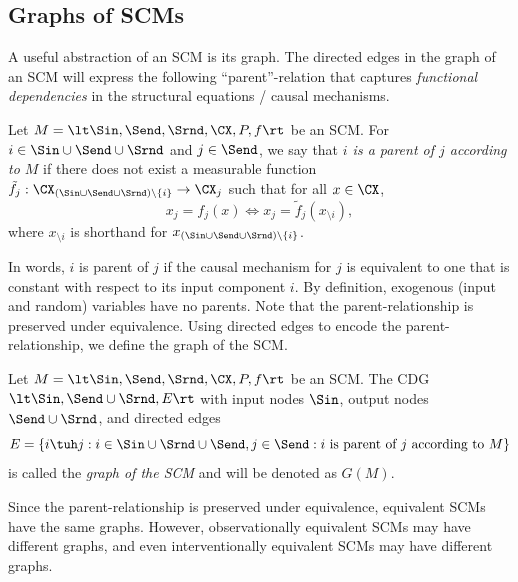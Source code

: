 \subsection{Graphs of SCMs}

A useful abstraction of an SCM is its graph. 
The directed edges in the graph of an SCM will express the following ``parent''-relation that captures \emph{functional dependencies} in the structural equations / causal mechanisms.
\begin{Def}\label{def:scm_parent}
  Let $M = \lt \Sin, \Send, \Srnd, \CX, P, f \rt$ be an SCM.
  For $i \in \Sin \cup \Send \cup \Srnd$ and $j \in \Send$, we say that
  \emph{$i$ is a parent of $j$ according to $M$} if there does not exist a measurable function 
  $\tilde f_j : \CX_{(\Sin\cup\Send\cup\Srnd) \setminus \{i\}} \to \CX_j$
  such that for all $x \in \CX$,
  $$x_j = f_j(x) \iff x_j = \tilde f_j(x_{\setminus i}),$$
  where $x_{\setminus i}$ is shorthand for $x_{(\Sin\cup\Send\cup\Srnd)\setminus\{i\}}$.
\end{Def}
In words, $i$ is parent of $j$ if the causal mechanism for $j$ is equivalent to one that is constant with respect to its input component $i$.
By definition, exogenous (input and random) variables have no parents.
Note that the parent-relationship is preserved under equivalence.
Using directed edges to encode the parent-relationship, we define the graph of the SCM.
\begin{Def}\label{def:scm_graph}
  Let $M = \lt \Sin, \Send, \Srnd, \CX, P, f \rt$ be an SCM.
  The CDG $\lt \Sin, \Send \cup \Srnd, E \rt$ with
  input nodes $\Sin$, output nodes $\Send\cup\Srnd$, and
  directed edges 
  $$E = \{i \tuh j : i \in \Sin\cup\Srnd\cup\Send, j\in\Send: \text{$i$ is parent of $j$ according to $M$}\}$$
  is called the \emph{graph of the SCM} and will be denoted as $G(M)$.
\end{Def}
Since the parent-relationship is preserved under equivalence, equivalent SCMs have the same graphs.
However, observationally equivalent SCMs may have different graphs, and even interventionally equivalent
SCMs may have different graphs.
